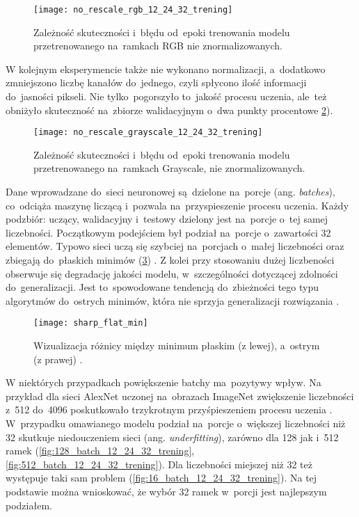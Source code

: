 \begin{figure}[h!]
	\centering
	\centering
		\texttt{[image: no\_rescale\_rgb\_12\_24\_32\_trening]}	
	\caption{Zależność skuteczności i~błędu od~epoki trenowania modelu przetrenowanego na~ramkach RGB nie znormalizowanych.}	\label{fig:no_rescale_rgb_12_24_32_trening}
\end{figure}

{\parindent0pt
W kolejnym eksperymencie także nie wykonano normalizacji, a~dodatkowo zmniejszono liczbę kanałów do~jednego, czyli spłycono ilość informacji do~jasności pikseli. Nie tylko~pogorszyło to~jakość procesu uczenia, ale~też obniżyło skuteczność na~zbiorze walidacyjnym o~dwa punkty procentowe \ref{fig:no_rescale_grayscale_12_24_32_trening}).

\begin{figure}[h!]
	\centering
	\centering
		\texttt{[image: no\_rescale\_grayscale\_12\_24\_32\_trening]}	
	\caption{Zależność skuteczności i~błędu od~epoki trenowania modelu przetrenowanego na~ramkach Grayscale, nie znormalizowanych.}	\label{fig:no_rescale_grayscale_12_24_32_trening}
\end{figure}

Dane wprowadzane do~sieci neuronowej są~dzielone na~porcje (ang. \textit{batches}), co~odciąża maszynę liczącą i~pozwala na~przyspieszenie procesu uczenia. Każdy podzbiór: uczący, walidacyjny i~testowy dzielony jest na~porcje o~tej samej liczebności. Początkowym podejściem był podział na~porcje o~zawartości 32 elementów. Typowo sieci uczą się szybciej na~porcjach o~małej liczebności oraz zbiegają do~płaskich minimów (\ref{fig:sharp_flat_min}) . Z kolei przy stosowaniu dużej liczbeności obserwuje się degradację jakości modelu, w~szczególności dotyczącej zdolności do~generalizacji. Jest to~spowodowane tendencją do~zbieżności tego typu algorytmów do~ostrych minimów, która nie sprzyja generalizacji rozwiązania \cite{Keskar2016OnLT}. 

\begin{figure}[h!]
	\centering
	\centering
		\texttt{[image: sharp\_flat\_min]}	
	\caption{Wizualizacja różnicy między minimum płaskim (z lewej), a~ostrym (z prawej) \cite{sharp_flat_min}.}	\label{fig:sharp_flat_min}
\end{figure}

W niektórych przypadkach powiększenie batchy ma~pozytywy wpływ. Na przykład dla sieci AlexNet uczonej na~obrazach ImageNet zwiększenie liczebności z~512 do~4096 poskutkowało trzykrotnym przyśpieszeniem procesu uczenia \cite{You2017ScalingSB}. W~przypadku omawianego modelu podział na~porcje o~większej liczebności niż 32 skutkuje niedouczeniem sieci (ang. \textit{underfitting}), zarówno dla 128 jak i~512 ramek (\ref{fig:128_batch_12_24_32_trening}, \ref{fig:512_batch_12_24_32_trening}). Dla liczebności miejszej niż 32 też występuje taki sam problem (\ref{fig:16_batch_12_24_32_trening}). Na tej podstawie można wnioskować, że wybór 32 ramek w~porcji jest najlepszym podziałem.

}
